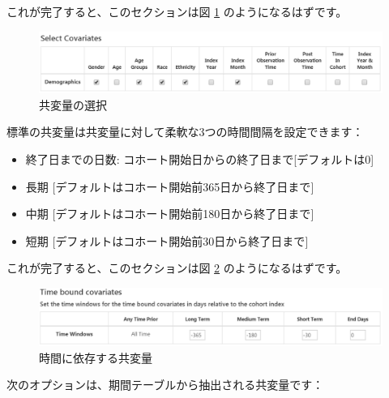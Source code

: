 \documentclass[
  11pt]{book}
\providecommand{\tightlist}{%
  \setlength{\itemsep}{0pt}\setlength{\parskip}{0pt}}
\theoremstyle{definition}
\theoremstyle{definition}
\theoremstyle{definition}
\theoremstyle{definition}
\theoremstyle{remark}
\begin{document}
これが完了すると、このセクションは図 \ref{fig:covariateSettings2} のようになるはずです。

\begin{figure}

{\centering \includegraphics[width=1\linewidth]{images/PatientLevelPrediction/covariateSettings2} 

}

\caption{共変量の選択}\label{fig:covariateSettings2}
\end{figure}

標準の共変量は共変量に対して柔軟な3つの時間間隔を設定できます：

\begin{itemize}
\tightlist
\item
  終了日までの日数: コホート開始日からの終了日まで{[}デフォルトは0{]}
\item
  長期 {[}デフォルトはコホート開始前365日から終了日まで{]}
\item
  中期 {[}デフォルトはコホート開始前180日から終了日まで{]}
\item
  短期 {[}デフォルトはコホート開始前30日から終了日まで{]}
\end{itemize}

これが完了すると、このセクションは図 \ref{fig:covariateSettings3} のようになるはずです。

\begin{figure}

{\centering \includegraphics[width=1\linewidth]{images/PatientLevelPrediction/covariateSettings3} 

}

\caption{時間に依存する共変量}\label{fig:covariateSettings3}
\end{figure}

次のオプションは、期間テーブルから抽出される共変量です：
\end{document}
